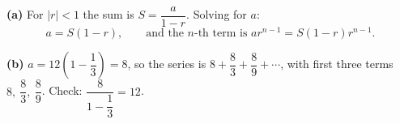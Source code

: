 \textbf{(a)} For $|r|<1$ the sum is $S=\dfrac{a}{1-r}$. Solving for $a$:
\[
a=S(1-r),\qquad\text{and the $n$-th term is } ar^{n-1}=S(1-r)r^{n-1}.
\]

\textbf{(b)} $a=12\left(1-\dfrac{1}{3}\right)=8$, so the series is $8+\dfrac{8}{3}+\dfrac{8}{9}+\cdots$, with first three terms $\boxed{8,\ \dfrac{8}{3},\ \dfrac{8}{9}}$. Check: $\dfrac{8}{1-\dfrac{1}{3}}=12$.
